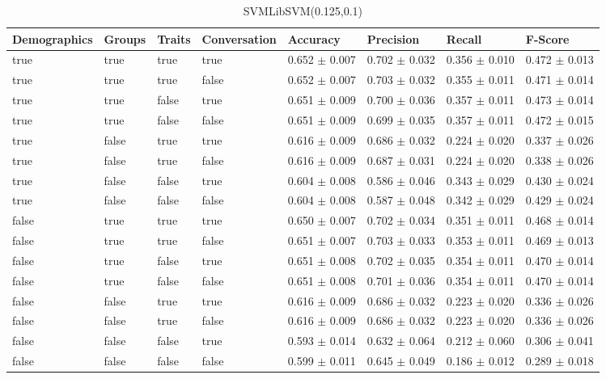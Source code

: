 \begin{table}[h]
	\centering
	\begin{tabular}{|l|l|l|l|l|l|l|l|} %
	\hline
	Demographics & Groups & Traits & Conversation & Accuracy & Precision & Recall & F-Score \\ \hline
	true & true & true & true & 0.652	\( \pm \) 0.007	& 0.702	\( \pm \) 0.032	& 0.356	\( \pm \) 0.010	& 0.472	\( \pm \) 0.013	\\ \hline
	true & true & true & false & 0.652	\( \pm \) 0.007	& 0.703	\( \pm \) 0.032	& 0.355	\( \pm \) 0.011	& 0.471	\( \pm \) 0.014	\\ \hline
	true & true & false & true & 0.651	\( \pm \) 0.009	& 0.700	\( \pm \) 0.036	& 0.357	\( \pm \) 0.011	& 0.473	\( \pm \) 0.014	\\ \hline
	true & true & false & false & 0.651	\( \pm \) 0.009	& 0.699	\( \pm \) 0.035	& 0.357	\( \pm \) 0.011	& 0.472	\( \pm \) 0.015	\\ \hline
	true & false & true & true & 0.616	\( \pm \) 0.009	& 0.686	\( \pm \) 0.032	& 0.224	\( \pm \) 0.020	& 0.337	\( \pm \) 0.026	\\ \hline
	true & false & true & false & 0.616	\( \pm \) 0.009	& 0.687	\( \pm \) 0.031	& 0.224	\( \pm \) 0.020	& 0.338	\( \pm \) 0.026	\\ \hline
	true & false & false & true & 0.604	\( \pm \) 0.008	& 0.586	\( \pm \) 0.046	& 0.343	\( \pm \) 0.029	& 0.430	\( \pm \) 0.024	\\ \hline
	true & false & false & false & 0.604	\( \pm \) 0.008	& 0.587	\( \pm \) 0.048	& 0.342	\( \pm \) 0.029	& 0.429	\( \pm \) 0.024	\\ \hline
	false & true & true & true & 0.650	\( \pm \) 0.007	& 0.702	\( \pm \) 0.034	& 0.351	\( \pm \) 0.011	& 0.468	\( \pm \) 0.014	\\ \hline
	false & true & true & false & 0.651	\( \pm \) 0.007	& 0.703	\( \pm \) 0.033	& 0.353	\( \pm \) 0.011	& 0.469	\( \pm \) 0.013	\\ \hline
	false & true & false & true & 0.651	\( \pm \) 0.008	& 0.702	\( \pm \) 0.035	& 0.354	\( \pm \) 0.011	& 0.470	\( \pm \) 0.014	\\ \hline
	false & true & false & false & 0.651	\( \pm \) 0.008	& 0.701	\( \pm \) 0.036	& 0.354	\( \pm \) 0.011	& 0.470	\( \pm \) 0.014	\\ \hline
	false & false & true & true & 0.616	\( \pm \) 0.009	& 0.686	\( \pm \) 0.032	& 0.223	\( \pm \) 0.020	& 0.336	\( \pm \) 0.026	\\ \hline
	false & false & true & false & 0.616	\( \pm \) 0.009	& 0.686	\( \pm \) 0.032	& 0.223	\( \pm \) 0.020	& 0.336	\( \pm \) 0.026	\\ \hline
	false & false & false & true & 0.593	\( \pm \) 0.014	& 0.632	\( \pm \) 0.064	& 0.212	\( \pm \) 0.060	& 0.306	\( \pm \) 0.041	\\ \hline
	false & false & false & false & 0.599	\( \pm \) 0.011	& 0.645	\( \pm \) 0.049	& 0.186	\( \pm \) 0.012	& 0.289	\( \pm \) 0.018	\\ \hline
	\end{tabular}
	\caption{SVMLibSVM(0.125,0.1)}
	\label{tab:revpol}
\end{table}
